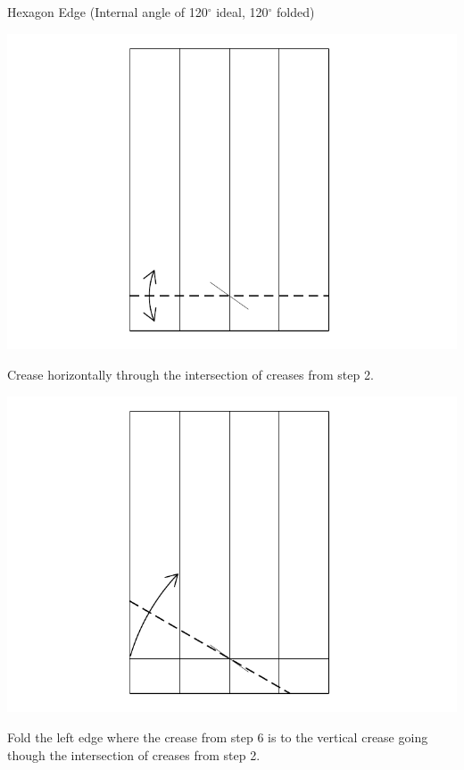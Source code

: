 \documentclass[11pt]{article}
\begin{document}
\newpage
{\Large Hexagon Edge} (Internal angle of 120$^\circ$ ideal, 120$^\circ$ folded)
\vspace*{0.25in}

\begin{minipage}[t]{0.3\textwidth}
  \includegraphics[width=\textwidth]{../figs/fig06-04}
  \begin{itemize}{\item[4.] Crease horizontally through the intersection of creases from step 2.}\end{itemize}
\end{minipage}
\begin{minipage}[t]{0.3\textwidth}
  \includegraphics[width=\textwidth]{../figs/fig06-05}
  \begin{itemize}{\item[5.] Fold the left edge where the crease from step 6 is to the  vertical crease going though the intersection of creases from step 2.}\end{itemize}
\end{minipage}
\end{document}
